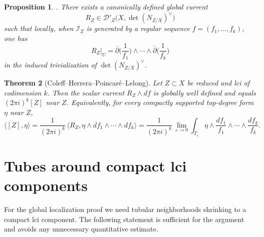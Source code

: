 \documentclass[12pt,a4paper,dvipsnames,x11names]{amsart}
\numberwithin{equation}{section}
\theoremstyle{plain}
\newtheorem{theorem}{Theorem}[section]
\newtheorem{proposition}[theorem]{Proposition}
\theoremstyle{definition}
\theoremstyle{remark}
\newcommand{\II}{\mathscr I}
\begin{document}
\begin{proposition}\label{prop:RZ}\cite{CH78,Passare88,Demailly}.
There exists a canonically defined global current
\begin{equation}\label{eq:RZ}
R_Z\in \mathscr D'_Z\bigl(X,\det(N_{Z/X})^\vee\bigr)
\end{equation}
such that locally, when $\II_Z$ is generated by a regular sequence $f=(f_1,\dots,f_k)$, one has
\begin{equation}\label{eq:RZ-local}
R_Z|_U=\bar\partial\Big(\frac{1}{f_1}\Big)\wedge\cdots\wedge \bar\partial\Big(\frac{1}{f_k}\Big)
\end{equation}
in the induced trivialization of $\det(N_{Z/X})^\vee$.
\end{proposition}


\begin{theorem}[Coleff--Herrera--Poincar\'e--Lelong]\cite{CH78,Passare88}  \cite[\S III]{Demailly}\label{thm:CH-PL}
Let $Z\subset X$ be reduced and lci of codimension $k$. Then the scalar current $R_Z\wedge df$ is globally well defined and equals $(2\pi i)^k[Z]$ near $Z$. Equivalently, for every compactly supported top-degree form $\eta$ near $Z$,
\begin{equation}\label{eq:CH-equals-Z}
\langle [Z],\eta\rangle
=
\frac{1}{(2\pi i)^k}\,\big\langle R_Z,\eta\wedge df_1\wedge\cdots\wedge df_k\big\rangle
=
\frac{1}{(2\pi i)^k}\,\lim_{\varepsilon\to 0}\int_{T_\varepsilon}
\eta\wedge \frac{df_1}{f_1}\wedge\cdots\wedge\frac{df_k}{f_k}.
\end{equation}
\end{theorem}

 
 

\section{Tubes around compact lci components}\label{sec:tubes}

For the global localization proof we need tubular neighborhoods shrinking to a compact lci component. The following statement is sufficient for the argument and avoids any unnecessary quantitative estimate.
\end{document}
